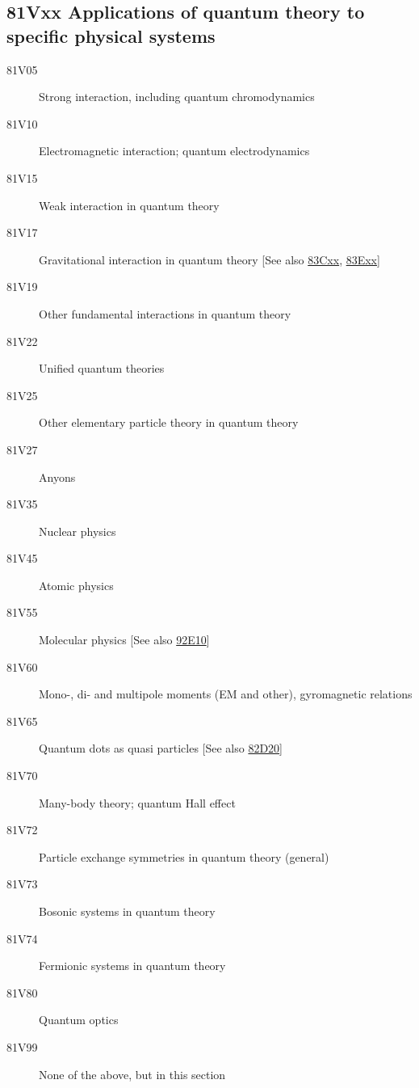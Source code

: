 \documentclass[letterpaper]{article}
\begin{document}
\subsection*{81Vxx  Applications of quantum theory to specific physical systems }\label{81Vxx}
\begin{description}  
\item [81V05]\label{81V05} Strong interaction, including quantum chromodynamics
\item [81V10]\label{81V10} Electromagnetic interaction; quantum electrodynamics
\item [81V15]\label{81V15} Weak interaction in quantum theory
\item [81V17]\label{81V17} Gravitational interaction in quantum theory [See also \hyperref[83Cxx]{83Cxx}, \hyperref[83Exx]{83Exx}]
\item [81V19]\label{81V19} Other fundamental interactions in quantum theory
\item [81V22]\label{81V22} Unified quantum theories
\item [81V25]\label{81V25} Other elementary particle theory in quantum theory
\item [81V27]\label{81V27} Anyons
\item [81V35]\label{81V35} Nuclear physics
\item [81V45]\label{81V45} Atomic physics
\item [81V55]\label{81V55} Molecular physics [See also \hyperref[92E10]{92E10}]
\item [81V60]\label{81V60} Mono-, di- and multipole moments (EM and other), gyromagnetic relations
\item [81V65]\label{81V65} Quantum dots as quasi particles [See also \hyperref[82D20]{82D20}]
\item [81V70]\label{81V70} Many-body theory; quantum Hall effect
\item [81V72]\label{81V72} Particle exchange symmetries in quantum theory (general)
\item [81V73]\label{81V73} Bosonic systems in quantum theory
\item [81V74]\label{81V74} Fermionic systems in quantum theory
\item [81V80]\label{81V80} Quantum optics
\item [81V99]\label{81V99} None of the above, but in this section
\end{description}
\end{document}
